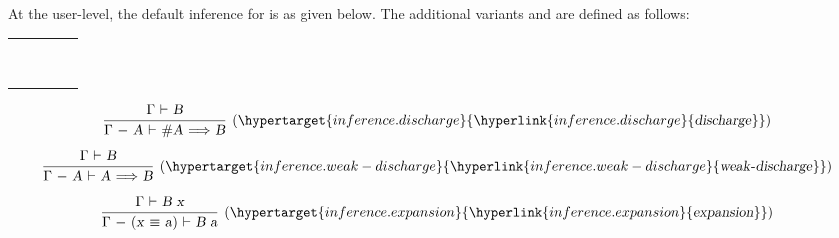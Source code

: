 \begin{isabellebody}
\begin{isamarkuptext}
  At the user-level, the default inference for \hyperlink{command.assume}{\mbox{}} is
  \hyperlink{inference.discharge}{\mbox{}} as given below.  The additional variants
  \hyperlink{command.presume}{\mbox{}} and \hyperlink{command.def}{\mbox{}} are defined as follows:

  \medskip
  \begin{tabular}{rcl}
    \hyperlink{command.presume}{\mbox{\isa{\isacommand{presume}}}}~\isa{A} & \isa{{\isachardoublequote}{\isasymequiv}{\isachardoublequote}} & \hyperlink{command.assume}{\mbox{\isa{\isacommand{assume}}}}~\isa{{\isachardoublequote}{\isasymguillemotleft}weak{\isasymdash}discharge{\isasymguillemotright}\ A{\isachardoublequote}} \\
    \hyperlink{command.def}{\mbox{\isa{\isacommand{def}}}}~\isa{{\isachardoublequote}x\ {\isasymequiv}\ a{\isachardoublequote}} & \isa{{\isachardoublequote}{\isasymequiv}{\isachardoublequote}} & \hyperlink{command.fix}{\mbox{\isa{\isacommand{fix}}}}~\isa{x}~\hyperlink{command.assume}{\mbox{\isa{\isacommand{assume}}}}~\isa{{\isachardoublequote}{\isasymguillemotleft}expansion{\isasymguillemotright}\ x\ {\isasymequiv}\ a{\isachardoublequote}} \\
  \end{tabular}
  \medskip

  \[
  \infer[(\indexdef{}{inference}{discharge}\hypertarget{inference.discharge}{\hyperlink{inference.discharge}{\mbox{\isa{discharge}}}})]{\isa{{\isachardoublequote}{\isasymstrut}{\isasymGamma}\ {\isacharminus}\ A\ {\isasymturnstile}\ {\isacharhash}A\ {\isasymLongrightarrow}\ B{\isachardoublequote}}}{\isa{{\isachardoublequote}{\isasymstrut}{\isasymGamma}\ {\isasymturnstile}\ B{\isachardoublequote}}}
  \]
  \[
  \infer[(\indexdef{}{inference}{weak-discharge}\hypertarget{inference.weak-discharge}{\hyperlink{inference.weak-discharge}{\mbox{\isa{weak{\isasymdash}discharge}}}})]{\isa{{\isachardoublequote}{\isasymstrut}{\isasymGamma}\ {\isacharminus}\ A\ {\isasymturnstile}\ A\ {\isasymLongrightarrow}\ B{\isachardoublequote}}}{\isa{{\isachardoublequote}{\isasymstrut}{\isasymGamma}\ {\isasymturnstile}\ B{\isachardoublequote}}}
  \]
  \[
  \infer[(\indexdef{}{inference}{expansion}\hypertarget{inference.expansion}{\hyperlink{inference.expansion}{\mbox{\isa{expansion}}}})]{\isa{{\isachardoublequote}{\isasymstrut}{\isasymGamma}\ {\isacharminus}\ {\isacharparenleft}x\ {\isasymequiv}\ a{\isacharparenright}\ {\isasymturnstile}\ B\ a{\isachardoublequote}}}{\isa{{\isachardoublequote}{\isasymstrut}{\isasymGamma}\ {\isasymturnstile}\ B\ x{\isachardoublequote}}}
  \]


\end{isamarkuptext}
\end{isabellebody}
